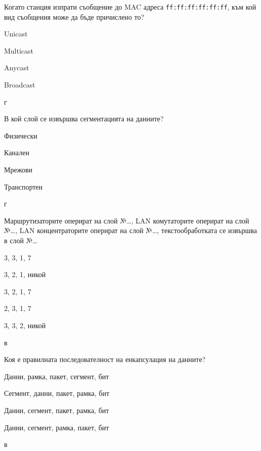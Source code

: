 \begin{q}
  Когато станция изпрати съобщение до MAC адреса \texttt{ff:ff:ff:ff:ff:ff},
  към кой вид съобщения може да бъде причислено то?

  \begin{defractors}
  \item Unicast
  \item Multicast
  \item Anycast
  \item Broadcast
  \end{defractors}

  \rans г
\end{q}

\begin{q}
  В кой слой се извършва сегментацията на данните?

  \begin{defractors}
  \item Физически
  \item Канален
  \item Мрежови
  \item Транспортен
  \end{defractors}

  \rans г
\end{q}

\begin{q}
  Маршрутизаторите оперират на слой №\dots, LAN комутаторите оперират на слой
  №\dots, LAN концентраторите оперират на слой №\dots, текстообработката се
  извършва в слой №\dots

  \begin{defractors}
  \item 3, 3, 1, 7
  \item 3, 2, 1, никой
  \item 3, 2, 1, 7
  \item 2, 3, 1, 7
  \item 3, 3, 2, никой
  \end{defractors}

  \rans в
\end{q}

\begin{q}
  Коя е правилната последователност на енкапсулация на данните?

  \begin{defractors}
  \item Данни, рамка, пакет, сегмент, бит
  \item Сегмент, данни, пакет, рамка, бит
  \item Данни, сегмент, пакет, рамка, бит
  \item Данни, сегмент, рамка, пакет, бит
  \end{defractors}

  \rans в
\end{q}


